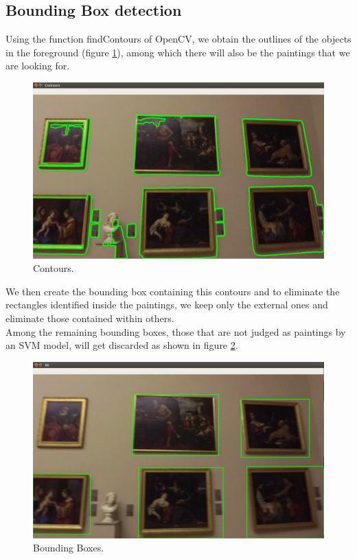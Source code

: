 \documentclass[conference]{IEEEtran}
\begin{document}
\bigskip

\subsection{Bounding Box detection}
Using the function findContours of OpenCV, we obtain the outlines of the objects in the foreground (figure \ref{fig:3_contours}), among which there will also be the paintings that we are looking for.\\
\bigskip

\begin{figure}[htbp]
  \centering
  \includegraphics[width=0.8\columnwidth]{../detection_pipeline/3_contours.png}
  \caption{Contours.}
  \label{fig:3_contours}
\end{figure}

\bigskip
We then create the bounding box containing this contours and to eliminate the rectangles identified inside the paintings, we keep only the external ones and eliminate those contained within others.\\
Among the remaining bounding boxes, those that are not judged as paintings by an SVM model, will get discarded as shown in figure \ref{fig:4_bb}.

\bigskip

\begin{figure}[htbp]
  \centering
  \includegraphics[width=0.8\columnwidth]{../detection_pipeline/4_bb.png}
  \caption{Bounding Boxes.}
  \label{fig:4_bb}
\end{figure}
\end{document}

